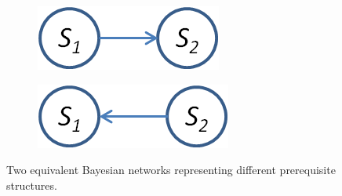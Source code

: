 \documentclass{edm_template}
\begin{document}
	\begin{figure}[!ht]\small
		\centering
		\begin{subfigure}[t]{0.48\linewidth}
			\centering
			\includegraphics[width=0.5\linewidth]{figures/s1s2.png}
			\caption{\label{fig:equivnet1}}
		\end{subfigure}
		\begin{subfigure}[t]{0.48\linewidth}
			\centering
			\includegraphics[width=0.5\linewidth]{figures/s2s1.png}
			\caption{\label{fig:equivnet2}}
		\end{subfigure}		
		\caption{Two equivalent Bayesian networks representing different prerequisite structures.\label{fig:equivnets} }
	\end{figure}
	
\end{document}
